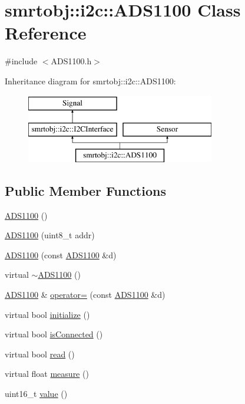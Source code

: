 \hypertarget{classsmrtobj_1_1i2c_1_1_a_d_s1100}{}\section{smrtobj\+:\+:i2c\+:\+:A\+D\+S1100 Class Reference}
\label{classsmrtobj_1_1i2c_1_1_a_d_s1100}


{\ttfamily \#include $<$A\+D\+S1100.\+h$>$}

Inheritance diagram for smrtobj\+:\+:i2c\+:\+:A\+D\+S1100\+:\begin{figure}[H]
\begin{center}
\leavevmode
\includegraphics[height=3.000000cm]{classsmrtobj_1_1i2c_1_1_a_d_s1100}
\end{center}
\end{figure}
\subsection*{Public Member Functions}
\begin{DoxyCompactItemize}
\item 
\hyperlink{classsmrtobj_1_1i2c_1_1_a_d_s1100_a52f87f6cbfdc26c07a2c9bfa9e703928}{A\+D\+S1100} ()
\item 
\hyperlink{classsmrtobj_1_1i2c_1_1_a_d_s1100_a22e0bfc04d0cf6eb9c4a56e643b20a7e}{A\+D\+S1100} (uint8\+\_\+t addr)
\item 
\hyperlink{classsmrtobj_1_1i2c_1_1_a_d_s1100_a04610e29101e86c39e786c17b756e960}{A\+D\+S1100} (const \hyperlink{classsmrtobj_1_1i2c_1_1_a_d_s1100}{A\+D\+S1100} \&d)
\item 
virtual \hyperlink{classsmrtobj_1_1i2c_1_1_a_d_s1100_a658ca003cc76799a7199e1c38e34d1ea}{$\sim$\+A\+D\+S1100} ()
\item 
\hyperlink{classsmrtobj_1_1i2c_1_1_a_d_s1100}{A\+D\+S1100} \& \hyperlink{classsmrtobj_1_1i2c_1_1_a_d_s1100_ac023e56015781bc14ed0af5da16e4adb}{operator=} (const \hyperlink{classsmrtobj_1_1i2c_1_1_a_d_s1100}{A\+D\+S1100} \&d)
\item 
virtual bool \hyperlink{classsmrtobj_1_1i2c_1_1_a_d_s1100_af6a30ae17ea283aa979bbd933d84ee08}{initialize} ()
\item 
virtual bool \hyperlink{classsmrtobj_1_1i2c_1_1_a_d_s1100_a707ea27963bcca7465d51195cee0af04}{is\+Connected} ()
\item 
virtual bool \hyperlink{classsmrtobj_1_1i2c_1_1_a_d_s1100_ae57857e0b925c23af5406773bbaa3da9}{read} ()
\item 
virtual float \hyperlink{classsmrtobj_1_1i2c_1_1_a_d_s1100_ade27b68b0e321e5a8bd79fd119725f04}{measure} ()
\item 
uint16\+\_\+t \hyperlink{classsmrtobj_1_1i2c_1_1_a_d_s1100_aaf1867906432c5de522d7f3f0cd889c5}{value} ()
\end{DoxyCompactItemize}
